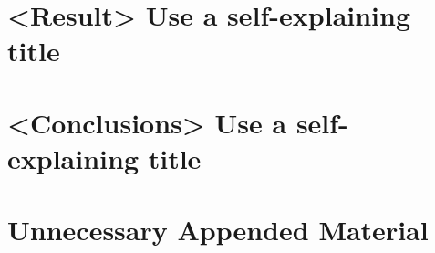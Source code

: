 \documentclass{kththesis}
\begin{document}
\chapter{<Result> Use a self-explaining title}


\chapter{<Conclusions> Use a self-explaining title}


\printbibliography[heading=bibintoc] 

\appendix

\chapter{Unnecessary Appended Material}
\end{document}
